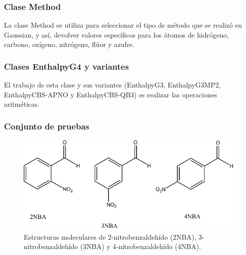 \documentclass{beamer}
\begin{document}
\begin{frame}
\frametitle{Clase Method}
La clase Method se utiliza para seleccionar el tipo de método que se realizó en Gaussian, y así, devolver valores específicos para los átomos de hidrógeno, carbono, oxígeno, nitrógeno, flúor y azufre.
\end{frame}
\begin{frame}
\frametitle{Clases EnthalpyG4 y variantes}
El trabajo de esta clase y sus variantes (EnthalpyG3, EnthalpyG3MP2, EnthalpyCBS-APNO y EnthalpyCBS-QB3) es realizar las operaciones aritméticas.
\end{frame}

\begin{frame}
\frametitle{Conjunto de pruebas}


\begin{figure}[hbtp]
\begin{center}
\includegraphics[width=\textwidth]{images/n-NBA.pdf}
\caption{Estructuras moleculares de 2-nitrobenzaldeh\'{i}do (2NBA), 3-nitrobenzaldeh\'{i}do (3NBA) y 4-nitrobenzaldeh\'{i}do (4NBA).}
\label{n-NBA}
\end{center}
\end{figure}

\end{frame}
\end{document}
